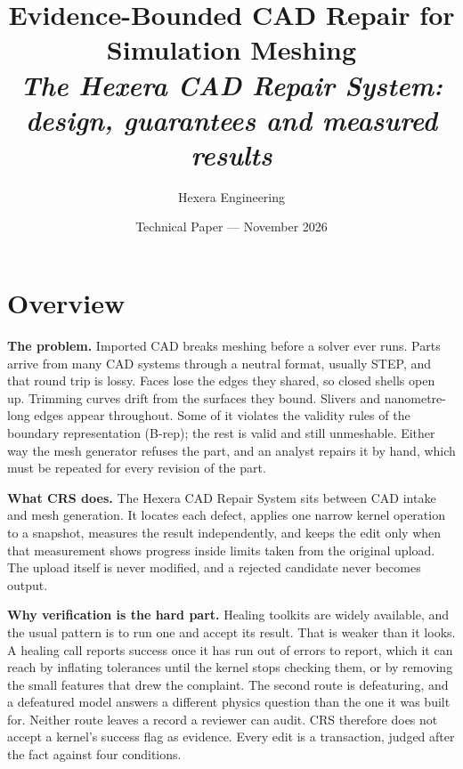 \documentclass[10pt,onecolumn]{article}
\title{\vspace{-1.3cm}\bfseries Evidence-Bounded CAD Repair for Simulation Meshing\\[0.2em]
       \large\normalfont\itshape The Hexera CAD Repair System: design, guarantees and measured results}
\author{Hexera Engineering}
\date{Technical Paper --- November 2026}
\newcommand{\topic}[1]{\textbf{#1.}\hspace{0.5em}\ignorespaces}
\begin{document}
\maketitle
\thispagestyle{plain}

\section{Overview}

\topic{The problem} Imported CAD breaks meshing before a solver ever runs. Parts arrive from many
CAD systems through a neutral format, usually STEP, and that round trip is lossy. Faces lose the
edges they shared, so closed shells open up. Trimming curves drift from the surfaces they bound.
Slivers and nanometre-long edges appear throughout. Some of it violates the validity rules of the boundary
representation (B-rep); the rest is valid and still unmeshable. Either way the mesh generator
refuses the part, and an analyst repairs it by hand, which must be repeated for every revision of
the part.

\topic{What CRS does} The Hexera CAD Repair System sits between CAD intake and mesh generation. It
locates each defect, applies one narrow kernel operation to a snapshot, measures the result
independently, and keeps the edit only when that measurement shows progress inside limits taken
from the original upload. The upload itself is never modified, and a rejected candidate never
becomes output.

\topic{Why verification is the hard part} Healing toolkits are widely available, and the usual
pattern is to run one and accept its result. That is weaker than it looks. A healing call reports
success once it has run out of errors to report, which it can reach by inflating tolerances until
the kernel stops checking them, or by removing the small features that drew the complaint. The
second route is defeaturing, and a defeatured model answers a different physics question than the
one it was built for. Neither route leaves a record a reviewer can audit. CRS therefore does
not accept a kernel's success flag as evidence. Every edit is a transaction, judged after the fact
against four conditions.
\end{document}
